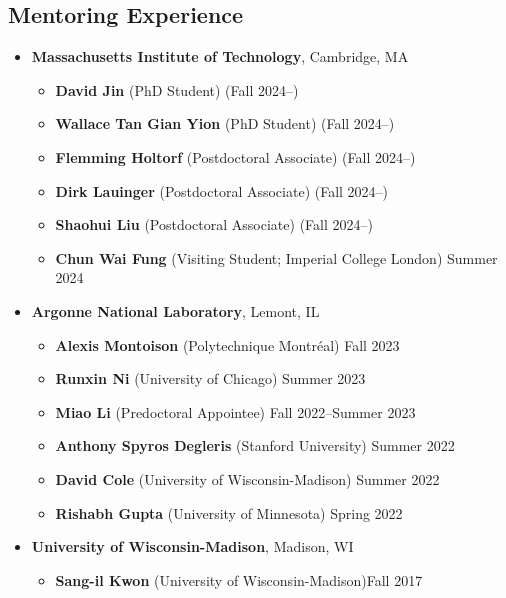 \documentclass[letterpaper, 11pt]{article}
\begin{document}
\subsection*{Mentoring Experience}
\begin{itemize}[leftmargin=*]
  \item[] {\bf Massachusetts Institute of Technology}, Cambridge, MA
  \begin{itemize}[leftmargin=*]
    \item[] {\bf David Jin} (PhD Student) \hfill (Fall 2024--)
    \item[] {\bf Wallace Tan Gian Yion} (PhD Student) \hfill (Fall 2024--)
    \item[] {\bf Flemming Holtorf} (Postdoctoral Associate) \hfill (Fall 2024--)
    \item[] {\bf Dirk Lauinger} (Postdoctoral Associate) \hfill (Fall 2024--)
    \item[] {\bf Shaohui Liu} (Postdoctoral Associate) \hfill (Fall 2024--)
    \item[] {\bf Chun Wai Fung} (Visiting Student; Imperial College London) \hfill Summer 2024
  \end{itemize}
\item[] {\bf Argonne National Laboratory}, Lemont, IL
  \begin{itemize}[leftmargin=*]
  \item[] {\bf Alexis Montoison} (Polytechnique Montr\'{e}al) \hfill Fall 2023
  \item[] {\bf Runxin Ni} (University of Chicago) \hfill Summer 2023
  \item[] {\bf Miao Li} (Predoctoral Appointee) \hfill Fall 2022--Summer 2023
  \item[] {\bf Anthony Spyros Degleris} (Stanford University) \hfill Summer 2022
  \item[] {\bf David Cole} (University of Wisconsin-Madison) \hfill Summer 2022
  \item[] {\bf Rishabh Gupta} (University of Minnesota) \hfill Spring 2022
  \end{itemize}
\item[] {\bf University of Wisconsin-Madison}, Madison, WI
  \begin{itemize}[leftmargin=*]
  \item[] {\bf Sang-il Kwon} (University of Wisconsin-Madison)\hfill Fall 2017
  \end{itemize}
\end{itemize}
\end{document}
